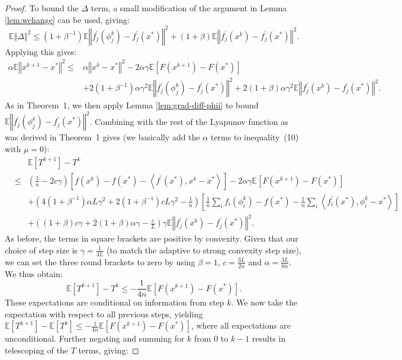 \documentclass{article}
\newcommand{\stepsize}{\gamma} %
\begin{document}
\begin{proof}
To bound the $\Delta$ term, a small modification of the argument in Lemma \ref{lem:wchange} can be used, giving:
\[
\mathbb{E}\left\Vert \Delta\right\Vert ^{2} \leq \left(1+\beta^{-1}\right)\mathbb{E}\left\Vert f_{j}^{\prime}(\phi_{j}^{k})-f_{j}^{\prime}(x^{*})\right\Vert ^{2}+\left(1+\beta\right)\mathbb{E}\left\Vert f_{j}^{\prime}(x^{k})-f_{j}^{\prime}(x^{*})\right\Vert ^{2}.
\]
 Applying this gives:
\begin{align*}
\alpha \mathbb{E}\left\Vert x^{k+1}-x^{*}\right\Vert ^{2} \leq {} & \alpha\left\Vert x^k-x^{*}\right\Vert ^{2}-2\alpha\stepsize\mathbb{E}\left[F(x^{k+1})-F(x^{*})\right]\\
& +2(1+\beta^{-1})\alpha\stepsize^2\mathbb{E}\left\Vert f_{j}^{\prime}(\phi_{j}^{k})-f_{j}^{\prime}(x^{*})\right\Vert ^{2}+2\left(1+\beta\right)\alpha\stepsize^{2}\mathbb{E}\left\Vert f_{j}^{\prime}(x^k)-f_{j}^{\prime}(x^{*})\right\Vert ^{2}.
\end{align*}
As in Theorem~1, %
we then apply Lemma \ref{lem:grad-diff-phii} to bound $\mathbb{E}\left\Vert f_{j}^{\prime}(\phi_{j}^{k})-f_{j}^{\prime}(x^{*})\right\Vert ^{2}$. Combining with the rest of the Lyapunov function as was derived in Theorem~1 gives (we basically add the $\alpha$ terms to inequality~(10) with $\mu=0$):
\begin{eqnarray*}
 &  & \mathbb{E}[T^{k+1}]-T^{k} \\
 & \leq & \left(\frac{1}{n}-2c\gamma\right)\left[f(x^{k})-f(x^{*})-\left\langle f^{\prime}(x^{*}),x^{k}-x^{*}\right\rangle \right]-2\alpha\gamma\mathbb{E}\left[F(x^{k+1})-F(x^{*})\right]\\
 &  & +\left(4(1+\beta^{-1})\alpha L\gamma^{2}+2(1+\beta^{-1})cL\gamma^{2}-\frac{1}{n}\right)\left[\frac{1}{n}\sum_{i}f_{i}(\phi_{i}^{k})-f(x^{*})-\frac{1}{n}\sum_{i}\left\langle f_{i}^{\prime}(x^{*}),\phi_{i}^{k}-x^{*}\right\rangle \right] \\
 &  & +\left((1+\beta)c\gamma+2(1+\beta)\alpha\gamma-\frac{c}{L}\right)\gamma\mathbb{E}\left\Vert f_{j}^{\prime}(x^{k})-f_{j}^{\prime}(x^{*})\right\Vert ^{2}.
\end{eqnarray*}
As before, the terms in square brackets are positive by convexity. Given that our choice of step size is $\gamma=\frac{1}{3L}$ (to match the adaptive to strong convexity step size), we can set the three round brackets to zero by using $\beta=1$, $c=\frac{3L}{2n}$ and $\alpha=\frac{3L}{8n}$. We thus obtain:
\[
\mathbb{E}[T^{k+1}]-T^{k}\leq-\frac{1}{4n}\mathbb{E}\left[F(x^{k+1})-F(x^{*})\right].
\]
These expectations are conditional on information from step $k$. We now take the expectation with respect to all previous steps, yielding $\mathbb{E}[T^{k+1}]-\mathbb{E}[T^{k}] \leq-\frac{1}{4n}\mathbb{E}\left[F(x^{k+1})-F(x^{*})\right]$, where all expectations are unconditional. Further negating and summing for $k$ from $0$ to $k-1$ results in telescoping of the $T$ terms, giving:

\end{proof}
\end{document}
